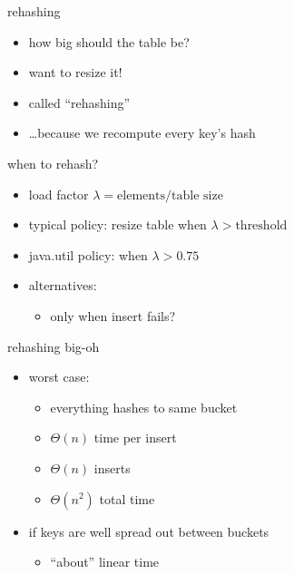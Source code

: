 \begin{frame}{rehashing}
\begin{itemize}
\item how big should the table be?
\vspace{.5cm}
\item want to resize it!
\item called ``rehashing''
\item \ldots because we recompute every key's hash
\end{itemize}
\end{frame}

\begin{frame}{when to rehash?}
\begin{itemize}
\item load factor $\lambda = \text{elements} / \text{table size}$
\item typical policy: resize table when $\lambda > \text{threshold}$
\item java.util policy: when $\lambda > 0.75$
\vspace{.5cm}
\item alternatives:
\begin{itemize}
    \item only when insert fails?
    \end{itemize}
\end{itemize}
\end{frame}

\begin{frame}{rehashing big-oh}
\begin{itemize}
\item worst case:
    \begin{itemize}
    \item everything hashes to same bucket
    \item $\Theta(n)$ time per insert
    \item $\Theta(n)$ inserts
    \item $\Theta(n^2)$ total time
    \end{itemize}
\item if keys are well spread out between buckets
    \begin{itemize}
    \item ``about'' linear time
    \end{itemize}
\end{itemize}
\end{frame}

